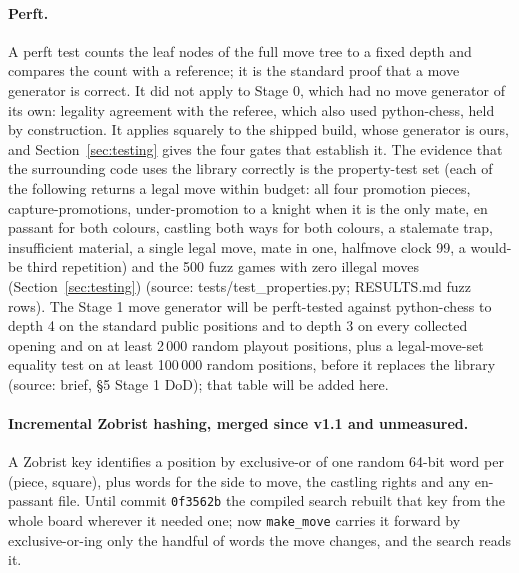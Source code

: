 \documentclass[11pt,a4paper]{article}
\newcommand{\src}[1]{{\small(source: #1)}}
\newcommand{\code}[1]{\texttt{#1}}
\begin{document}
\paragraph{Perft.} A perft test counts the leaf nodes of the full move tree to a fixed depth and compares
the count with a reference; it is the standard proof that a move generator is correct. It did not apply to
Stage 0, which had no move generator of its own: legality agreement with the referee, which also used
python-chess, held by construction. It applies squarely to the shipped build, whose generator is ours, and
Section~\ref{sec:testing} gives the four gates that establish it. The evidence that the surrounding code uses
the library correctly is the property-test set (each of the following returns a legal move within budget:
all four promotion pieces, capture-promotions, under-promotion to a knight when it is the only mate, en
passant for both colours, castling both ways for both colours, a stalemate trap, insufficient material,
a single legal move, mate in one, halfmove clock 99, a would-be third repetition) and the 500 fuzz games
with zero illegal moves (Section~\ref{sec:testing}) \src{tests/test\_properties.py; RESULTS.md fuzz rows}.
The Stage 1 move generator will be perft-tested against python-chess to depth 4 on the standard public
positions and to depth 3 on every collected opening and on at least 2\,000 random playout positions, plus a
legal-move-set equality test on at least 100\,000 random positions, before it replaces the library
\src{brief, \S 5 Stage 1 DoD}; that table will be added here.


\paragraph{Incremental Zobrist hashing, merged since v1.1 and unmeasured.} A Zobrist key identifies a
position by exclusive-or of one random 64-bit word per (piece, square), plus words for the side to
move, the castling rights and any en-passant file. Until commit \code{0f3562b} the compiled search
rebuilt that key from the whole board wherever it needed one; now \code{make\_move} carries it forward
by exclusive-or-ing only the handful of words the move changes, and the search reads it.
\end{document}
